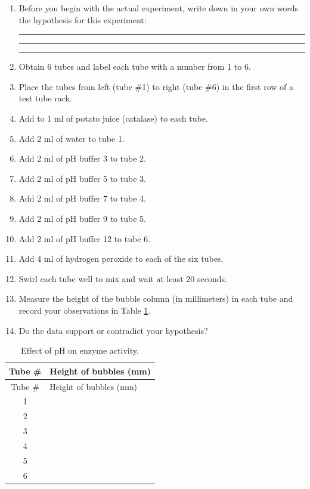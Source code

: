 \documentclass[]{book}
\begin{document}
\begin{enumerate}
\def\labelenumi{\arabic{enumi}.}
\item
  Before you begin with the actual experiment, write down in your own words the hypothesis for this experiment:

  \begin{center}\rule{0.5\linewidth}{\linethickness}\end{center}

  \begin{center}\rule{0.5\linewidth}{\linethickness}\end{center}

  \begin{center}\rule{0.5\linewidth}{\linethickness}\end{center}
\item
  Obtain 6 tubes and label each tube with a number from 1 to 6.
\item
  Place the tubes from left (tube \#1) to right (tube \#6) in the first row of a test tube rack.
\item
  Add to 1 ml of potato juice (catalase) to each tube.
\item
  Add 2 ml of water to tube 1.
\item
  Add 2 ml of pH buffer 3 to tube 2.
\item
  Add 2 ml of pH buffer 5 to tube 3.
\item
  Add 2 ml of pH buffer 7 to tube 4.
\item
  Add 2 ml of pH buffer 9 to tube 5.
\item
  Add 2 ml of pH buffer 12 to tube 6.
\item
  Add 4 ml of hydrogen peroxide to each of the six tubes.
\item
  Swirl each tube well to mix and wait at least 20 seconds.
\item
  Measure the height of the bubble column (in millimeters) in each tube and record your observations in Table \ref{tab:pH}.
\item
  Do the data support or contradict your hypothesis?
\end{enumerate}

\begin{longtable}[]{@{}cl@{}}
\caption{\label{tab:pH} Effect of pH on enzyme activity.}\tabularnewline
\toprule
Tube \# & Height of bubbles (mm)\tabularnewline
\midrule
\endfirsthead
\toprule
Tube \# & Height of bubbles (mm)\tabularnewline
\midrule
\endhead
1 &\tabularnewline
2 &\tabularnewline
3 &\tabularnewline
4 &\tabularnewline
5 &\tabularnewline
6 &\tabularnewline
\bottomrule
\end{longtable}
\end{document}
